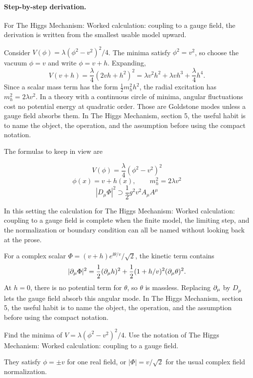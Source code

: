 \paragraph{Step-by-step derivation.}

For The Higgs Mechanism: Worked calculation: coupling to a gauge field, the derivation is written from the smallest usable model upward.

Consider \(V(\phi)=\lambda(\phi^2-v^2)^2/4\).  The minima satisfy \(\phi^2=v^2\), so choose the vacuum \(\phi=v\) and write \(\phi=v+h\).  Expanding,
\[
  V(v+h)=\frac{\lambda}{4}(2vh+h^2)^2
  =\lambda v^2h^2+\lambda vh^3+\frac{\lambda}{4}h^4.
\]
Since a scalar mass term has the form \(\frac12m_h^2h^2\), the radial excitation has \(m_h^2=2\lambda v^2\).  In a theory with a continuous circle of minima, angular fluctuations cost no potential energy at quadratic order.  Those are Goldstone modes unless a gauge field absorbs them.  In The Higgs Mechanism, section 5, the useful habit is to name the object, the operation, and the assumption before using the compact notation.

The formulas to keep in view are

\[
  V(\phi)=\frac{\lambda}{4}(\phi^2-v^2)^2
\]
\[
  \phi(x)=v+h(x),\qquad m_h^2=2\lambda v^2
\]
\[
  |D_\mu\Phi|^2\supset \frac12g^2v^2A_\mu A^\mu
\]

In this setting the calculation for The Higgs Mechanism: Worked calculation: coupling to a gauge field is complete when the finite model, the limiting step, and the normalization or boundary condition can all be named without looking back at the prose.




\begin{example}
For a complex scalar \(\Phi=(v+h)e^{\ii\theta/v}/\sqrt2\), the kinetic term contains
\[
  |\partial_\mu\Phi|^2=\frac12(\partial_\mu h)^2+\frac12(1+h/v)^2(\partial_\mu\theta)^2.
\]
At \(h=0\), there is no potential term for \(\theta\), so \(\theta\) is massless.  Replacing \(\partial_\mu\) by \(D_\mu\) lets the gauge field absorb this angular mode.  In The Higgs Mechanism, section 5, the useful habit is to name the object, the operation, and the assumption before using the compact notation.
\end{example}



\begin{exercise}
Find the minima of \(V=\lambda(\phi^2-v^2)^2/4\).  Use the notation of The Higgs Mechanism: Worked calculation: coupling to a gauge field.
\begin{answer}
They satisfy \(\phi=\pm v\) for one real field, or \(|\Phi|=v/\sqrt2\) for the usual complex field normalization.
\end{answer}
\end{exercise}

